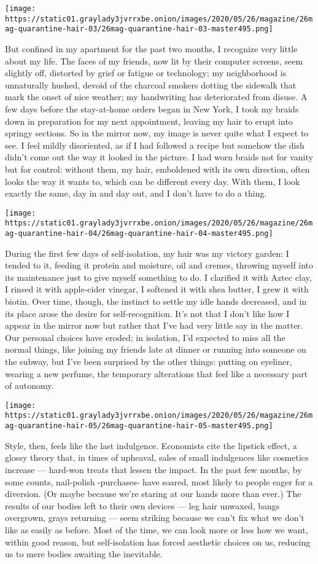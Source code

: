 \texttt{[image: https://static01.graylady3jvrrxbe.onion/images/2020/05/26/magazine/26mag-quarantine-hair-03/26mag-quarantine-hair-03-master495.png]}

But confined in my apartment for the past two months, I recognize very
little about my life. The faces of my friends, now lit by their computer
screens, seem slightly off, distorted by grief or fatigue or technology;
my neighborhood is unnaturally hushed, devoid of the charcoal smokers
dotting the sidewalk that mark the onset of nice weather; my handwriting
has deteriorated from disuse. A few days before the stay-at-home orders
began in New York, I took my braids down in preparation for my next
appointment, leaving my hair to erupt into springy sections. So in the
mirror now, my image is never quite what I expect to see. I feel mildly
disoriented, as if I had followed a recipe but somehow the dish didn't
come out the way it looked in the picture. I had worn braids not for
vanity but for control: without them, my hair, emboldened with its own
direction, often looks the way it wants to, which can be different every
day. With them, I look exactly the same, day in and day out, and I don't
have to do a thing.

\texttt{[image: https://static01.graylady3jvrrxbe.onion/images/2020/05/26/magazine/26mag-quarantine-hair-04/26mag-quarantine-hair-04-master495.png]}

During the first few days of self-isolation, my hair was my victory
garden: I tended to it, feeding it protein and moisture, oil and cremes,
throwing myself into its maintenance just to give myself something to
do. I clarified it with Aztec clay, I rinsed it with apple-cider
vinegar, I softened it with shea butter, I grew it with biotin. Over
time, though, the instinct to settle my idle hands decreased, and in its
place arose the desire for self-recognition. It's not that I don't like
how I appear in the mirror now but rather that I've had very little say
in the matter. Our personal choices have eroded; in isolation, I'd
expected to miss all the normal things, like joining my friends late at
dinner or running into someone on the subway, but I've been surprised by
the other things: putting on eyeliner, wearing a new perfume, the
temporary alterations that feel like a necessary part of autonomy.

\texttt{[image: https://static01.graylady3jvrrxbe.onion/images/2020/05/26/magazine/26mag-quarantine-hair-05/26mag-quarantine-hair-05-master495.png]}

Style, then, feels like the last indulgence. Economists cite the
lipstick effect, a glossy theory that, in times of upheaval, sales of
small indulgences like cosmetics increase --- hard-won treats that
lessen the impact. In the past few months, by some counts, nail-polish
-purchases- have soared, most likely to people eager for a diversion.
(Or maybe because we're staring at our hands more than ever.) The
results of our bodies left to their own devices --- leg hair unwaxed,
bangs overgrown, grays returning --- seem striking because we can't fix
what we don't like as easily as before. Most of the time, we can look
more or less how we want, within good reason, but self-isolation has
forced aesthetic choices on us, reducing us to mere bodies awaiting the
inevitable.

